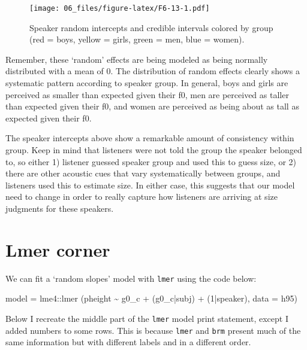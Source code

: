 \documentclass[
]{book}
\newenvironment{Shaded}{\begin{snugshade}}{\end{snugshade}}
\newcommand{\AttributeTok}[1]{\textcolor[rgb]{0.77,0.63,0.00}{#1}}
\newcommand{\DecValTok}[1]{\textcolor[rgb]{0.00,0.00,0.81}{#1}}
\newcommand{\FunctionTok}[1]{\textcolor[rgb]{0.00,0.00,0.00}{#1}}
\newcommand{\NormalTok}[1]{#1}
\newcommand{\OtherTok}[1]{\textcolor[rgb]{0.56,0.35,0.01}{#1}}
\newcommand{\SpecialCharTok}[1]{\textcolor[rgb]{0.00,0.00,0.00}{#1}}
\begin{document}
\begin{figure}
\centering
\texttt{[image: 06\_files/figure-latex/F6-13-1.pdf]}
\caption{\label{fig:F6-13}Speaker random intercepts and credible intervals colored by group (red = boys, yellow = girls, green = men, blue = women).}
\end{figure}

Remember, these `random' effects are being modeled as being normally distributed with a mean of 0. The distribution of random effects clearly shows a systematic pattern according to speaker group. In general, boys and girls are perceived as smaller than expected given their f0, men are perceived as taller than expected given their f0, and women are perceived as being about as tall as expected given their f0.

The speaker intercepts above show a remarkable amount of consistency within group. Keep in mind that listeners were not told the group the speaker belonged to, so either 1) listener guessed speaker group and used this to guess size, or 2) there are other acoustic cues that vary systematically between groups, and listeners used this to estimate size. In either case, this suggests that our model need to change in order to really capture how listeners are arriving at size judgments for these speakers.

\hypertarget{lmer-corner-2}{%
\section{Lmer corner}\label{lmer-corner-2}}

We can fit a `random slopes' model with \texttt{lmer} using the code below:

\begin{Shaded}
\begin{Highlighting}[]
\NormalTok{model }\OtherTok{=}\NormalTok{ lme4}\SpecialCharTok{::}\FunctionTok{lmer}\NormalTok{ (pheight }\SpecialCharTok{\textasciitilde{}}\NormalTok{ g0\_c }\SpecialCharTok{+}\NormalTok{  (g0\_c}\SpecialCharTok{|}\NormalTok{subj) }\SpecialCharTok{+}\NormalTok{ (}\DecValTok{1}\SpecialCharTok{|}\NormalTok{speaker), }\AttributeTok{data =}\NormalTok{ h95)}
\end{Highlighting}
\end{Shaded}

Below I recreate the middle part of the \texttt{lmer} model print statement, except I added numbers to some rows. This is because \texttt{lmer} and \texttt{brm} present much of the same information but with different labels and in a different order.
\end{document}
